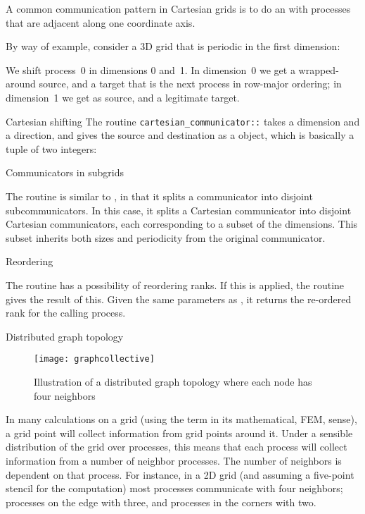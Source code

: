 A common communication pattern in Cartesian grids is to
do an  with processes that are adjacent
along one coordinate axis.

By way of example, consider a 3D grid that is periodic in the first dimension:
%

We shift process~0 in dimensions 0 and~1.
In dimension~0 we get a wrapped-around source,
and a target that is the next process in row-major ordering;
in dimension~1 we get  as source,
and a legitimate target.
%

\begin{mplnote}{Cartesian shifting}
  The routine \lstinline{cartesian_communicator::}
  takes a dimension and a direction,
  and gives the source and destination
  as a  object, which is basically
  a tuple of two integers:
\end{mplnote}

 {Communicators in subgrids}

The routine  is similar to
, in that it splits a communicator
into disjoint subcommunicators.
In this case, it splits a Cartesian communicator
into disjoint Cartesian communicators,
each corresponding to a subset of the dimensions.
This subset inherits both sizes and periodicity from the original communicator.


 {Reordering}
\label{sec:mpi-cart-map}

The  routine has a possibility
of reordering ranks. If this is applied,
the routine  gives the result of this.
Given the same parameters as ,
it returns the re-ordered rank for the calling process.

 {Distributed graph topology}
\label{sec:mpi-dist-graph}

\begin{figure}[ht]
  \texttt{[image: graphcollective]}
  \caption{Illustration of a distributed graph topology where each
    node has four neighbors}
  \label{fig:graphcollective}
\end{figure}

In many calculations on a grid (using the term in its mathematical,
\ac{FEM}, sense), a grid point will collect information from grid
points around it. Under a sensible distribution of the grid over
processes, this means that each process will collect information from
a number of neighbor processes. The number of 
neighbors is dependent on that process. For instance, in a 2D
grid (and assuming a five-point stencil for the computation) most
processes communicate with four neighbors; processes on the edge with
three, and processes in the corners with two.

